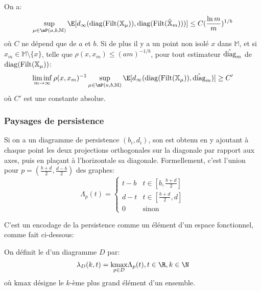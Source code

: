 \begin{thm}
	On a:
	\begin{equation*}
		\sup_{\mu \in \mP(a, b, \mathbb{M})} \E[\dinf(\diag(\filt(\X_{\mu})), \diag(\filt(\hatx{m})))] \leq C(\frac{\ln m}{m})^{1 / b}
	\end{equation*}
	où $C$ ne dépend que de $a$ et $b$.
	Si de plus il y a un point non isolé $x$ dans $\mathbb{M}$, et si $x_{m} \in \mathbb{M} \setminus \{x\}$,
	telle que $\rho(x, x_{m}) \leq (am)^{-1/b}$, pour tout estimateur $\hat{\operatorname{diag}}_{m}$ de $\operatorname{diag}(\operatorname{Filt}(\mathbb{X}_{\mu}))$:
	\begin{equation*}
		\liminf_{m \to \infty}\rho(x, x_{m})^{-1}\sup_{\mu \in \mP(a, b, \mathbb{M})}\E[\dinf(\diag(\filt(\X_{\mu})), \hat{\diag}_{m})] \geq C'
	\end{equation*}
	où $C'$ est une constante absolue.
\end{thm}

\subsubsection{Paysages de persistence}
\begin{definition}
	Si on a un diagramme de persistence $(b_{i}, d_{i})$, son  est obtenu en y ajoutant à chaque point les deux projections orthogonales sur la diagonale par rapport aux axes, puis en plaçant à l'horizontale sa diagonale.
	Formellement, c'est l'union pour $p = (\frac{b + d}{2}, \frac{d - b}{2})$ des graphes:
	\begin{equation*}
		\Lambda_{p}(t) = \begin{cases}
			t - b & t \in [b, \frac{b + d}{2}] \\
			d - t & t \in [\frac{b + d}{2}, d] \\
			0     & \text{sinon}
		\end{cases}
	\end{equation*}
\end{definition}

C'est un encodage de la persistence comme un élément d'un espace fonctionnel, comme fait ci-dessous:
\begin{definition}
	On définit le  d'un diagramme $D$ par:
	\begin{equation*}
		\lambda_{D}(k, t) = \underset{p \in D}{\mathrm{kmax}} \Lambda_{p}(t), t \in \R, k \in \N
	\end{equation*}
	où $\mathrm{kmax}$ désigne le $k$-ème plus grand élément d'un ensemble.
\end{definition}

